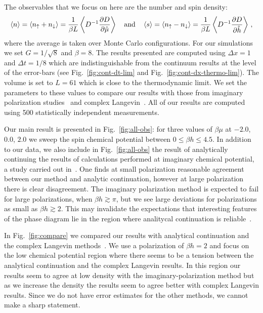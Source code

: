 \documentclass[aps,eqsecnum,amsmath,onecolumn,groupedaddress,superscriptaddress,notitlepage,nofootinbib]{revtex4-1}
\newcommand{\beq}{\begin{equation}}
\newcommand{\eeq}{\end{equation}}
\def\av#1{ \left\langle #1 \right\rangle }
\newcommand{\fig}[1]{Fig.~\ref{#1}}
\begin{document}
The observables that we focus on here are the number and spin density: 
\beq
\av n = \av{n_\up+n_\down}=\frac{1}{\beta L} \av{ D^{-1} \frac{\partial D}{\partial \hat \mu}} \quad\text{and}\quad
\av s = \av{n_\up-n_\down} = \frac{1}{\beta L} \av{ D^{-1} \frac{\partial D}{\partial \hat h}} \,,
\eeq
where the average is taken over Monte Carlo configurations. 
For our simulations we set $G=1/\sqrt 8$ and $\beta=8$. The results presented are computed
using $\Delta x=1$ and $\Delta t=1/8$ which are indistinguishable from the continuum results
at the level of the error-bars (see Fig.~\ref{fig:cont-dt-lim} and 
Fig.~\ref{fig:cont-dx-thermo-lim}). The volume is set to $L=61$ which is close to the
thermodynamic limit. We set the parameters to these values to compare our results with
those from imaginary polarization studies~\cite{PhysRevA.92.063609} and complex Langevin~\cite{Drut:2017fsv}.
All of our results are computed using 500 statistically independent measurements.


Our main result is presented in \fig{fig:all-obs}: for three values of $\beta \mu$ at $-2.0$, $0.0$, $2.0$ we sweep the spin chemical potential between $0\leq \beta h \leq 4.5$. In addition to our data, we also include in \fig{fig:all-obs} the result of analytically continuing the results of calculations performed at imaginary chemical potential, a study carried out in~\cite{PhysRevA.92.063609}. One finds at small polarization reasonable agreement between our method and analytic continuation, however at large polarization there is clear disagreement. The imaginary
polarization method is expected to fail for large polarizations, when $\beta h\gtrsim \pi$,
but we see large deviations for polarizations as small as $\beta h\gtrsim 2$. This may
invalidate the expectations that interesting features of the phase diagram lie in the
region where analitycal continuation is reliable~\cite{Braun:2012ww}.

In \fig{fig:compare} we compared our results with analytical continuation and the complex Langevin methods~\cite{Drut:2017fsv}. We use a polarization of $\beta h=2$ and focus on the low chemical
potential region where there seems to be a tension between the analytical continuation and
the complex Langevin results. In this region our results seem to agree at low density with
the imaginary-polarization method but as we increase the density the results seem to agree
better with complex Langevin results. Since we do not have error estimates for the other
methods, we cannot make a sharp statement.
\end{document}
